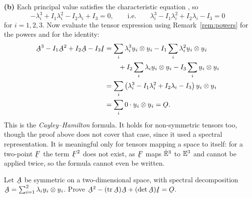 \begin{solution}
\textbf{(b)} Each principal value satisfies the characteristic equation
, so
\[
   -\lambda_{i}^{3}+I_{1}\lambda_{i}^{2}-I_{2}\lambda_{i}+I_{3}=0,
   \qquad\text{i.e.}\qquad
   \lambda_{i}^{3}-I_{1}\lambda_{i}^{2}+I_{2}\lambda_{i}-I_{3}=0
\]
for $i=1,2,3$. Now evaluate the tensor expression using
Remark~\ref{rem:powers} for the powers and  for the identity:
\[
\begin{aligned}
   \bA^{3}-I_{1}\bA^{2}+I_{2}\bA-I_{3}\I
   &=\sum_{i}\lambda_{i}^{3}\bu_{i}\otimes\bu_{i}
    -I_{1}\sum_{i}\lambda_{i}^{2}\bu_{i}\otimes\bu_{i}\\
   &\qquad+I_{2}\sum_{i}\lambda_{i}\bu_{i}\otimes\bu_{i}
    -I_{3}\sum_{i}\bu_{i}\otimes\bu_{i}\\
   &=\sum_{i}\big(\lambda_{i}^{3}-I_{1}\lambda_{i}^{2}
     +I_{2}\lambda_{i}-I_{3}\big)\,\bu_{i}\otimes\bu_{i}\\
   &=\sum_{i}0\cdot\bu_{i}\otimes\bu_{i}=\Ob .
\end{aligned}
\]
This is the \emph{Cayley--Hamilton} formula. It holds for non-symmetric
tensors too, though the proof above does not cover that case, since it
used a spectral representation. It is meaningful only for tensors mapping
a space to itself: for a two-point $\bF$ the term $\bF^{2}$ does not
exist, as $\bF$ maps $\hat{\mathbb{E}}^{3}$ to $\mathbb{E}^{3}$ and cannot be applied twice, so the
formula cannot even be written.
\end{solution}

\begin{problem}
Let $\bA$ be symmetric on a two-dimensional space, with spectral
decomposition $\bA=\sum_{i=1}^{2}\lambda_{i}\bu_{i}\otimes\bu_{i}$. Prove
$\bA^{2}-(\tr\bA)\bA+(\det\bA)\I=\Ob$.
\end{problem}

